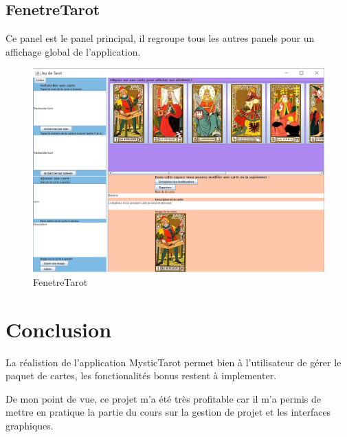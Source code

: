 \documentclass{article}
\begin{document}
\newpage
\subsection{FenetreTarot}
Ce panel est le panel principal, il regroupe tous les autres panels pour un affichage global de l'application.

\begin{figure}[!h]
\centering
\includegraphics[scale=0.60]{FenetreTarot.PNG}
\caption{FenetreTarot}
\label{fig:FenetreTarot}
\end{figure}

\newpage
\section{Conclusion}
La réalistion de l'application MysticTarot permet bien à l'utilisateur de gérer le paquet de cartes, les fonctionalités bonus restent à implementer.

De mon point de vue, ce projet m'a été très profitable car il m'a permis de mettre en pratique la partie du cours sur la gestion de projet et les interfaces graphiques.
\end{document}
